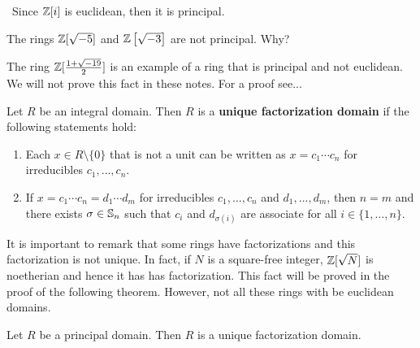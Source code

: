 \begin{example}\
	Since $\mathbb{Z}[i]$ is euclidean, then it is principal.
\end{example}
 
\begin{example}
	The rings $\mathbb{Z}[\sqrt{-5}]$ and $\mathbb{Z}\left[\sqrt{-3}\right]$ are
	not principal. Why?
\end{example}

The ring $\mathbb{Z}[\frac{1+\sqrt{-19}}{2}]$ is an 
example of a ring that is principal and not euclidean. We will not prove this
fact in these notes. For a proof see...

\begin{definition}
	Let $R$ be an integral domain. Then $R$ is a 
	\textbf{unique factorization domain}
	if the following statements hold:
	\begin{enumerate}
	\item Each $x\in R\setminus\{0\}$ that is not a unit can be written as $x=c_1\cdots c_n$ for irreducibles $c_1,\dots,c_n$. 
	\item If $x=c_1\cdots c_n=d_1\cdots d_m$ for irreducibles $c_1,\dots,c_n$ and $d_1,\dots,d_m$, then $n=m$ and there exists $\sigma\in\mathbb{S}_n$ such that $c_i$ and $d_{\sigma(i)}$ are
		associate for all $i\in\{1,\dots,n\}$. 
	\end{enumerate}
\end{definition}

It is important to remark that some rings 
have factorizations and this factorization is not unique. 
In fact, if $N$ is a square-free integer, $\mathbb{Z}[\sqrt{N}]$ is noetherian and hence it has  
has factorization. This fact will be proved in the proof of the following theorem. 
However, not all these rings with be euclidean domains. 

\begin{theorem}
	Let $R$ be a principal domain. 
	Then $R$ is a unique factorization domain.
\end{theorem}

